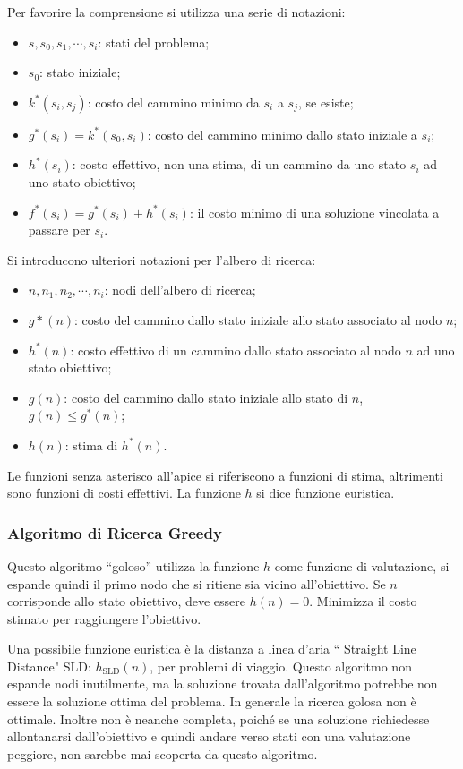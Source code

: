 \documentclass{article}
\numberwithin{equation}{subsection}
\begin{document}
Per favorire la comprensione si utilizza una serie di notazioni:
\begin{itemize}
    \item $s,s_0,s_1,\cdots,s_i$: stati del problema;
    \item $s_0$: stato iniziale;
    \item $k^*(s_i,s_j)$: costo del cammino minimo da $s_i$ a $s_j$, se esiste;
    \item $g^*(s_i)=k^*(s_0,s_i)$: costo del cammino minimo dallo stato iniziale a $s_i$;
    \item $h^*(s_i)$: costo effettivo, non una stima, di un cammino da uno stato $s_i$ ad uno stato obiettivo;
    \item $f^*(s_i)=g^*(s_i)+h^*(s_i)$: il costo minimo di una soluzione vincolata a passare per $s_i$. 
\end{itemize}
Si introducono ulteriori notazioni per l'albero di ricerca:
\begin{itemize}
    \item $n,n_1,n_2,\cdots,n_i$: nodi dell'albero di ricerca;
    \item $g*(n)$: costo del cammino dallo stato iniziale allo stato associato al nodo $n$;
    \item $h^*(n)$: costo effettivo di un cammino dallo stato associato al nodo $n$ ad uno stato obiettivo;
    \item $g(n)$: costo del cammino dallo stato iniziale allo stato di $n$, $g(n)\leq g^*(n)$;
    \item $h(n)$: stima di $h^*(n)$. 
\end{itemize}

Le funzioni senza asterisco all'apice si riferiscono a funzioni di stima, altrimenti sono funzioni di costi effettivi. La funzione $h$ si dice funzione euristica. 

\subsubsection{Algoritmo di Ricerca Greedy}

Questo algoritmo ``goloso'' utilizza la funzione $h$ come funzione di valutazione, si espande quindi il primo nodo che si ritiene sia vicino all'obiettivo. Se $n$ 
corrisponde allo stato obiettivo, deve essere $h(n)=0$. Minimizza il costo stimato per raggiungere l'obiettivo. 

Una possibile funzione euristica è la distanza a linea d'aria `` Straight Line Distance" SLD: $h_{\mathrm{SLD}}(n)$, per problemi di viaggio. Questo algoritmo non 
espande nodi inutilmente, ma la soluzione trovata dall'algoritmo potrebbe non essere la soluzione ottima del problema. In generale la ricerca golosa non è 
ottimale. Inoltre non è neanche completa, poiché se una soluzione richiedesse allontanarsi dall'obiettivo e quindi andare verso stati con una valutazione peggiore, non 
sarebbe mai scoperta da questo algoritmo. 
\end{document}
